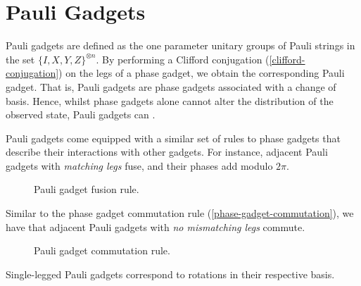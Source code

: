 \section{Pauli Gadgets}

Pauli gadgets are defined as the one parameter unitary groups of Pauli strings in the set $\{I, X, Y, Z\}^{\otimes n}$. By performing a Clifford conjugation (\ref{clifford-conjugation}) on the legs of a phase gadget, we obtain the corresponding Pauli gadget. That is, Pauli gadgets are phase gadgets associated with a change of basis. Hence, whilst phase gadgets alone cannot alter the distribution of the observed state, Pauli gadgets can \cite{Yeung2020}. 


Pauli gadgets come equipped with a similar set of rules to phase gadgets that describe their interactions with other gadgets. For instance, adjacent Pauli gadgets with \textit{matching legs} fuse, and their phases add modulo $2\pi$.

\begin{figure}[H]
    \centering
    \caption{Pauli gadget fusion rule.}
    \label{pauli-gadget-fusion}
\end{figure}

Similar to the phase gadget commutation rule (\ref{phase-gadget-commutation}), we have that adjacent Pauli gadgets with \textit{no mismatching legs} commute.

\begin{figure}[H]
    \centering
    \caption{Pauli gadget commutation rule.}
    \label{pauli-gadget-commutation}
\end{figure}

Single-legged Pauli gadgets correspond to rotations in their respective basis.

\vspace{5pt}

